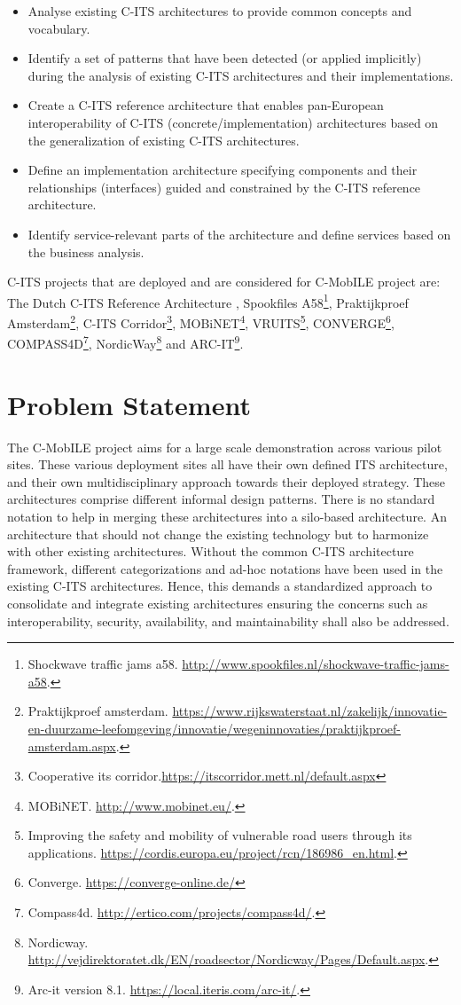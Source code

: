 \documentclass[conference]{IEEEtran}
\begin{document}
\begin{itemize}
  \item Analyse existing C-ITS architectures to provide common concepts and vocabulary.
  \item Identify a set of patterns that have been detected (or applied implicitly) during the analysis of existing C-ITS architectures and their implementations.
  \item Create a C-ITS reference architecture that enables pan-European interoperability of C-ITS (concrete/implementation) architectures based on the generalization of existing C-ITS architectures.
  \item Define an implementation architecture specifying components and their relationships (interfaces) guided and constrained by the C-ITS reference architecture.
  \item Identify service-relevant parts of the architecture and define services based on the business analysis.
\end{itemize}

C-ITS projects that are deployed and are considered for C-MobILE project are: The Dutch C-ITS Reference Architecture \cite{ditcm}, Spookfiles A58\footnote{Shockwave traffic jams a58. \url{http://www.spookfiles.nl/shockwave-traffic-jams-a58}.}, Praktijkproef Amsterdam\footnote{Praktijkproef amsterdam. \url{https://www.rijkswaterstaat.nl/zakelijk/innovatie-en-duurzame-leefomgeving/innovatie/wegeninnovaties/praktijkproef-amsterdam.aspx}.}, C-ITS Corridor\footnote{Cooperative its corridor.\url{https://itscorridor.mett.nl/default.aspx}}, MOBiNET\footnote{MOBiNET. \url{http://www.mobinet.eu/}.}, VRUITS\footnote{Improving the safety and mobility of vulnerable road users through its applications. \url{https://cordis.europa.eu/project/rcn/186986_en.html}.}, CONVERGE\footnote{Converge. \url{https://converge-online.de/}}, COMPASS4D\footnote{Compass4d. \url{http://ertico.com/projects/compass4d/}.}, NordicWay\footnote{Nordicway. \url{http://vejdirektoratet.dk/EN/roadsector/Nordicway/Pages/Default.aspx}.} and ARC-IT\footnote{Arc-it version 8.1. \url{https://local.iteris.com/arc-it/}.}.


\section{Problem Statement}

The C-MobILE project aims for a large scale demonstration across various pilot sites.
These various deployment sites all have their own defined ITS architecture, and their own multidisciplinary approach towards their deployed strategy.
These architectures comprise different informal design patterns.
There is no standard notation to help in merging these architectures into a silo-based architecture.
An architecture that should not change the existing technology but to harmonize with other existing architectures.
Without the common C-ITS architecture framework, different categorizations and ad-hoc notations have been used in the existing C-ITS architectures.
Hence, this demands a standardized approach to consolidate and integrate existing architectures ensuring the concerns such as interoperability, security, availability, and maintainability shall also be addressed.
\end{document}
